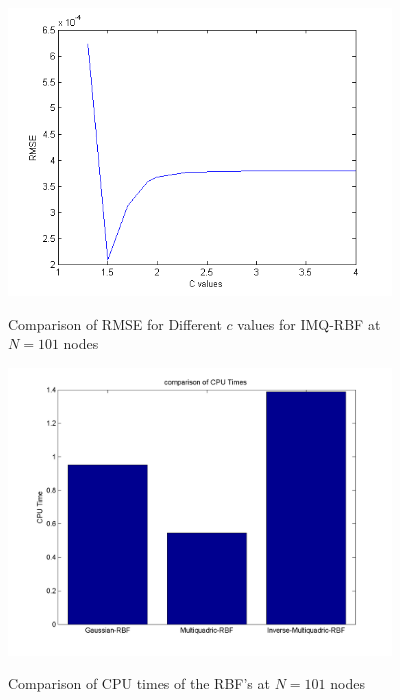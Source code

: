 \documentclass[12pt]{article}
\numberwithin{equation}{subsection} %
\begin{document}
 \begin{figure}[h]
\begin{center}
\includegraphics*[height=3in]{cimqlg.png}\
\end{center}
\vspace{-0.3in}
\caption{Comparison of RMSE for Different $c$ values for IMQ-RBF at
$N=101$ nodes }
\end{figure}



 \begin{figure}[h]
\begin{center}
\includegraphics*[height=3in]{cpu.png}\
\end{center}
 \vspace{-0.5in}
\caption{Comparison of CPU times of the RBF's at $N=101$ nodes }
\end{figure}
\end{document}
